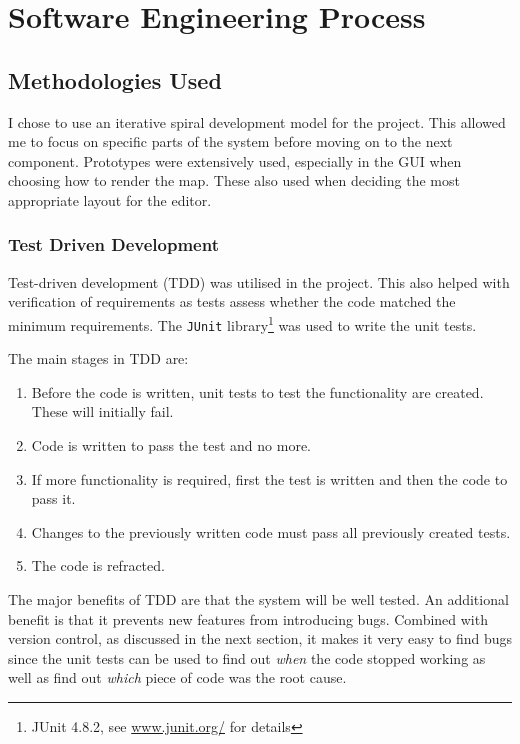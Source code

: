\section{Software Engineering Process}

\subsection{Methodologies Used}
\label{sub:methodologies_used}

I chose to use an iterative spiral development model for the project. This allowed me to focus on specific parts of the system before moving on to the next component. 
Prototypes were extensively used, especially in the GUI when choosing how to render the map. These also used when deciding the most appropriate layout for the editor. %


\subsubsection{Test Driven Development}
Test-driven development (TDD) was utilised in the project\cite{murphytest}. This also helped with verification of requirements as tests assess whether the code matched the minimum requirements. The \texttt{JUnit} library\footnote{JUnit 4.8.2, see \url{www.junit.org/} for details } was used to write the unit tests.  

The main stages in TDD are:\cite{desai2008survey}
\begin{enumerate}[noitemsep ]
	\item Before the code is written, unit tests to test the functionality are created. These will initially fail.
   \item Code is written to pass the test and no more.
   \item If more functionality is required, first the test is written and then the code to pass it.
   \item Changes to the previously written code must pass all previously created tests.
   \item The code is refracted. 
\end{enumerate}

The major benefits of TDD are that the system will be well tested.  An additional benefit is that  it  prevents new features from introducing bugs. Combined with version control, as discussed in the next section, it makes it very easy to find bugs since the unit tests can be used to find out \emph{when} the code stopped working as well as find out \emph{which} piece of code was the root cause.

